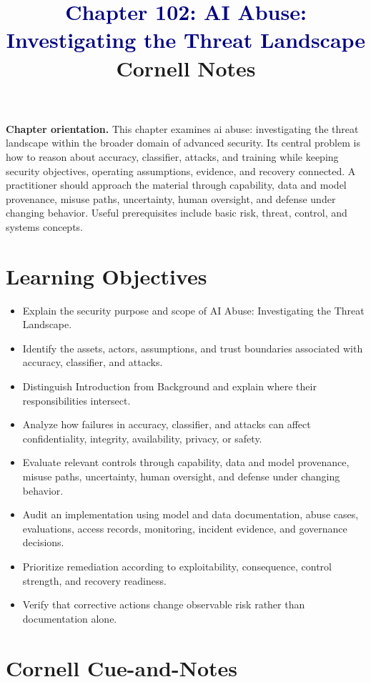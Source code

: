 \documentclass[11pt]{article}
\title{\textcolor{Navy}{Chapter 102: AI Abuse: Investigating the Threat Landscape}\\[2mm]\large Cornell Notes}
\author{}
\date{}
\begin{document}
\maketitle
\thispagestyle{fancy}
\vspace{-1.5em}
\begin{orientationbox}
\textbf{Chapter orientation.} This chapter examines ai abuse: investigating the threat landscape within the broader domain of advanced security. Its central problem is how to reason about accuracy, classifier, attacks, and training while keeping security objectives, operating assumptions, evidence, and recovery connected. A practitioner should approach the material through capability, data and model provenance, misuse paths, uncertainty, human oversight, and defense under changing behavior. Useful prerequisites include basic risk, threat, control, and systems concepts.
\end{orientationbox}
\section*{Learning Objectives}
\begin{itemize}
\item Explain the security purpose and scope of AI Abuse: Investigating the Threat Landscape.
\item Identify the assets, actors, assumptions, and trust boundaries associated with accuracy, classifier, and attacks.
\item Distinguish Introduction from Background and explain where their responsibilities intersect.
\item Analyze how failures in accuracy, classifier, and attacks can affect confidentiality, integrity, availability, privacy, or safety.
\item Evaluate relevant controls through capability, data and model provenance, misuse paths, uncertainty, human oversight, and defense under changing behavior.
\item Audit an implementation using model and data documentation, abuse cases, evaluations, access records, monitoring, incident evidence, and governance decisions.
\item Prioritize remediation according to exploitability, consequence, control strength, and recovery readiness.
\item Verify that corrective actions change observable risk rather than documentation alone.
\end{itemize}
\section*{Cornell Cue-and-Notes}
\end{document}
